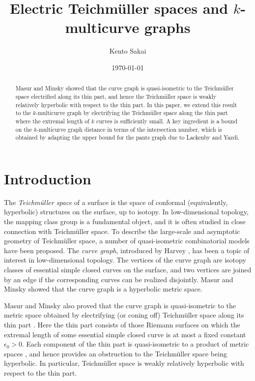 \documentclass[a4paper,11pt]{amsart}
\title[Electric Teichmüller spaces and $k$-multicurve graphs]{Electric Teichmüller spaces and $k$-multicurve graphs}
\author{Kento Sakai}
\date{\today}
\numberwithin{equation}{section}
\theoremstyle{definition}
\begin{document}
\begin{abstract}
    Masur and Minsky showed that the curve graph is quasi-isometric to the Teichmüller space electrified  along its thin part, and hence the Teichmüller space is weakly relatively hyperbolic with respect to the thin part. 
    In this paper, we extend this result to the $k$-multicurve graph by electrifying the Teichmüller space along the thin part where the extremal length of $k$ curves is sufficiently small. 
    A key ingredient is a bound on the $k$-multicurve graph distance in terms of the intersection number, which is obtained by adapting the upper bound for the pants graph due to Lackenby and Yazdi.
\end{abstract}
\maketitle

\section{Introduction}

The \textit{Teichmüller space} of a surface is the space of conformal (equivalently, hyperbolic) structures on the surface, up to isotopy.
In low-dimensional topology, the mapping class group is a fundamental object, and it is often studied in close connection with Teichmüller space.
To describe the large-scale and asymptotic geometry of Teichmüller space, a number of quasi-isometric combinatorial models have been proposed.
The \textit{curve graph}, introduced by Harvey \cite{harvey1981boundary}, has been a topic of interest in low-dimensional topology. 
The vertices of the curve graph are isotopy classes of essential simple closed curves on the surface, and two vertices are joined by an edge if the corresponding curves can be realized disjointly.
Masur and Minsky \cite{masur1999complex} showed that the curve graph is a hyperbolic metric space.

Masur and Minsky also proved that the curve graph is quasi-isometric to the metric space obtained by electrifying (or coning off) Teichmüller space along its thin part \cite[Theorem~1.2]{masur1999complex}.
Here the thin part consists of those Riemann surfaces on which the extremal length of some essential simple closed curve is at most a fixed constant $\epsilon_0>0$.
Each component of the thin part is quasi-isometric to a product of metric spaces \cite{minsky1996product}, and hence provides an obstruction to the Teichmüller space being hyperbolic.
In particular, Teichmüller space is weakly relatively hyperbolic with respect to the thin part.
\end{document}
